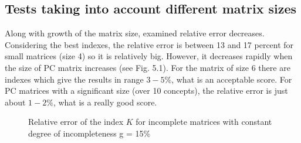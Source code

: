 \subsection{Tests taking into account different matrix sizes}
Along with growth of the matrix size, examined relative error decreases. Considering the best indexes, the relative error is between 13 and 17 percent for small matrices (size 4) so it is relatively big. However, it decreases rapidly when the size of PC matrix increases (see Fig. 5.1). For the matrix of size 6 there are indexes which give the results in range $3 - 5 \%$, what is an acceptable score. For PC matrices with a significant size (over 10 concepts), the relative error is just about $1 - 2 \%$, what is a really good score.





\begin{figure}[!h]
  \begin{center}
\caption{Relative error of the index $K$ for incomplete matrices with constant degree of incompleteness g = 15\%}
\end{center}
\end{figure}

